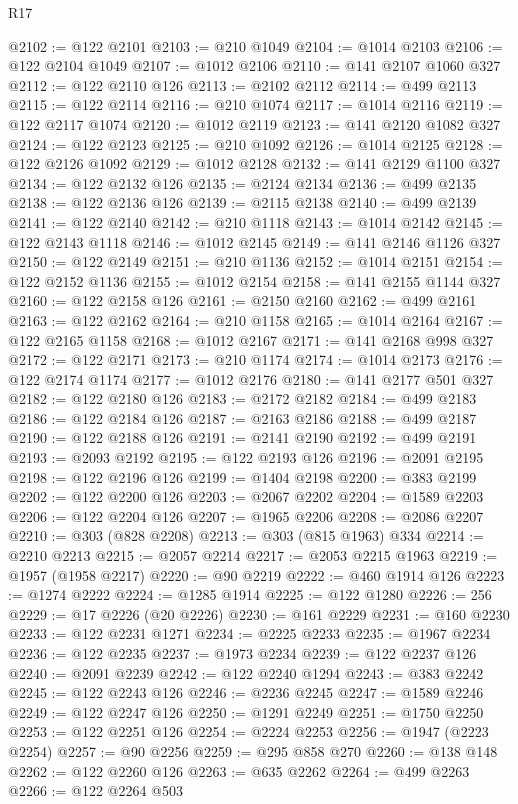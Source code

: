 \begin{lexlean}{R17}
\begin{coremodule}
@2102 := @122 @2101
@2103 := @210 @1049
@2104 := @1014 @2103
@2106 := @122 @2104 @1049
@2107 := @1012 @2106
@2110 := @141 @2107 @1060 @327
@2112 := @122 @2110 @126
@2113 := @2102 @2112
@2114 := @499 @2113
@2115 := @122 @2114
@2116 := @210 @1074
@2117 := @1014 @2116
@2119 := @122 @2117 @1074
@2120 := @1012 @2119
@2123 := @141 @2120 @1082 @327
@2124 := @122 @2123
@2125 := @210 @1092
@2126 := @1014 @2125
@2128 := @122 @2126 @1092
@2129 := @1012 @2128
@2132 := @141 @2129 @1100 @327
@2134 := @122 @2132 @126
@2135 := @2124 @2134
@2136 := @499 @2135
@2138 := @122 @2136 @126
@2139 := @2115 @2138
@2140 := @499 @2139
@2141 := @122 @2140
@2142 := @210 @1118
@2143 := @1014 @2142
@2145 := @122 @2143 @1118
@2146 := @1012 @2145
@2149 := @141 @2146 @1126 @327
@2150 := @122 @2149
@2151 := @210 @1136
@2152 := @1014 @2151
@2154 := @122 @2152 @1136
@2155 := @1012 @2154
@2158 := @141 @2155 @1144 @327
@2160 := @122 @2158 @126
@2161 := @2150 @2160
@2162 := @499 @2161
@2163 := @122 @2162
@2164 := @210 @1158
@2165 := @1014 @2164
@2167 := @122 @2165 @1158
@2168 := @1012 @2167
@2171 := @141 @2168 @998 @327
@2172 := @122 @2171
@2173 := @210 @1174
@2174 := @1014 @2173
@2176 := @122 @2174 @1174
@2177 := @1012 @2176
@2180 := @141 @2177 @501 @327
@2182 := @122 @2180 @126
@2183 := @2172 @2182
@2184 := @499 @2183
@2186 := @122 @2184 @126
@2187 := @2163 @2186
@2188 := @499 @2187
@2190 := @122 @2188 @126
@2191 := @2141 @2190
@2192 := @499 @2191
@2193 := @2093 @2192
@2195 := @122 @2193 @126
@2196 := @2091 @2195
@2198 := @122 @2196 @126
@2199 := @1404 @2198
@2200 := @383 @2199
@2202 := @122 @2200 @126
@2203 := @2067 @2202
@2204 := @1589 @2203
@2206 := @122 @2204 @126
@2207 := @1965 @2206
@2208 := @2086 @2207
@2210 := @303 (@828 @2208)
@2213 := @303 (@815 @1963) @334
@2214 := @2210 @2213
@2215 := @2057 @2214
@2217 := @2053 @2215 @1963
@2219 := @1957 (@1958 @2217)
@2220 := @90 @2219
@2222 := @460 @1914 @126
@2223 := @1274 @2222
@2224 := @1285 @1914
@2225 := @122 @1280
@2226 := 256
@2229 := @17 @2226 (@20 @2226)
@2230 := @161 @2229
@2231 := @160 @2230
@2233 := @122 @2231 @1271
@2234 := @2225 @2233
@2235 := @1967 @2234
@2236 := @122 @2235
@2237 := @1973 @2234
@2239 := @122 @2237 @126
@2240 := @2091 @2239
@2242 := @122 @2240 @1294
@2243 := @383 @2242
@2245 := @122 @2243 @126
@2246 := @2236 @2245
@2247 := @1589 @2246
@2249 := @122 @2247 @126
@2250 := @1291 @2249
@2251 := @1750 @2250
@2253 := @122 @2251 @126
@2254 := @2224 @2253
@2256 := @1947 (@2223 @2254)
@2257 := @90 @2256
@2259 := @295 @858 @270
@2260 := @138 @148
@2262 := @122 @2260 @126
@2263 := @635 @2262
@2264 := @499 @2263
@2266 := @122 @2264 @503

\end{coremodule}
\end{lexlean}
